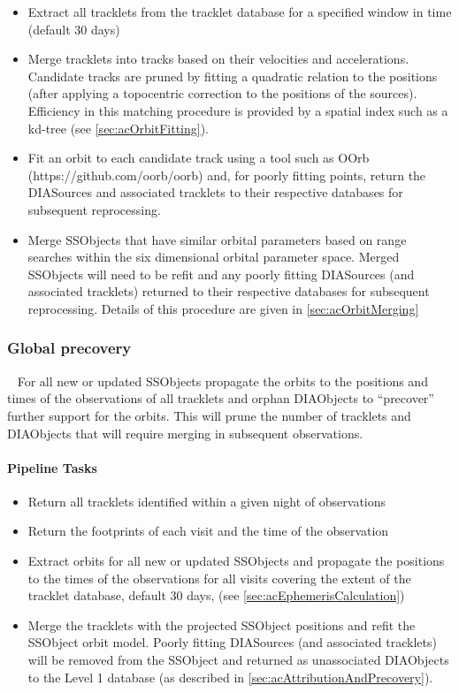 \begin{itemize}
\item Extract all tracklets from the tracklet database for a specified window in time (default 30 days)
\item Merge tracklets into tracks based on their velocities and accelerations. Candidate tracks are pruned by fitting a quadratic relation to the positions (after applying a topocentric correction to the positions of the sources). Efficiency in this matching procedure is provided by a spatial index such as a kd-tree (see \ref{sec:acOrbitFitting}). 
\item Fit an orbit to each candidate track using a tool such as OOrb \\(https://github.com/oorb/oorb) and, for poorly fitting  points, return the DIASources and associated tracklets to their respective databases for subsequent reprocessing.
\item Merge SSObjects that have similar orbital parameters based on range searches within the six dimensional orbital parameter space.  Merged SSObjects will need to be refit and any poorly fitting DIASources (and associated tracklets) returned  to their respective databases for subsequent reprocessing. Details of this procedure are given in \ref{sec:acOrbitMerging}
\end{itemize}

\subsubsection{Global precovery}~
For all new or updated SSObjects propagate the orbits to the positions and times of the observations of all tracklets and orphan DIAObjects to ``precover'' further support for the orbits. This will prune the number of tracklets and DIAObjects that will require merging in subsequent observations. 

\paragraph{Pipeline Tasks}

\begin{itemize}
\item Return all tracklets identified within a given night of observations
\item Return the footprints of each visit and the time of the observation
\item Extract orbits for all new or updated SSObjects and propagate the positions to the times of the observations for all visits covering the extent of the tracklet database, default 30 days, (see \ref{sec:acEphemerisCalculation})
\item Merge the tracklets with the projected SSObject positions and refit the SSObject orbit model. Poorly fitting DIASources (and associated tracklets) will be removed from the SSObject and returned as unassociated DIAObjects to the Level 1 database (as described in \ref{sec:acAttributionAndPrecovery}).
\end{itemize}


